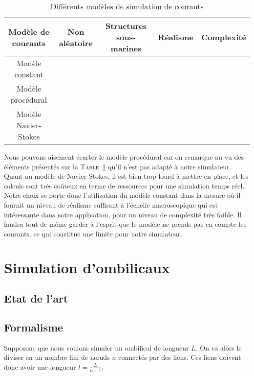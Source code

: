 			\begin{table}[ht]
				\centering
				\begin{adjustbox}{max width=\textwidth}
					\begin{tabular}{|c|c|c|c|c|}
						\hline
						\textbf{Modèle de courants} & \textbf{Non aléatoire} & \textbf{Structures sous-marines} & \textbf{Réalisme} & \textbf{Complexité} \\
						\hline
						Modèle constant & \cmark & \xmark & \pmark \pmark & \pmark\\
						\hline
						Modèle procédural & \xmark & \xmark & \pmark & \pmark \pmark \\
						\hline
						Modèle Navier-Stokes & \cmark & \cmark & \pmark \pmark \pmark & \pmark \pmark \pmark \\
						\hline
					\end{tabular}
				\end{adjustbox}
				\caption{Différents modèles de simulation de courants}
				\label{table:courants}
			\end{table}

			Nous pouvons aisement écarter le modèle procédural car on remarque au vu des éléments présentés sur la \textsc{Table}~\ref{table:courants} qu'il n'est pas adapté à notre simulateur. Quant au modèle de Navier-Stokes, il est bien trop lourd à mettre en place, et les calculs sont très coûteux en terme de ressources pour une simulation temps réel. Notre choix se porte donc l'utilisation du modèle constant dans la mesure où il fournit un niveau de réalisme suffisant à l'échelle macroscopique qui est intéressante dans notre application, pour un niveau de complexité très faible. Il faudra tout de même garder à l'esprit que le modèle ne prends pas en compte les courants, ce qui constitue une limite pour notre simulateur.

		\section{Simulation d'ombilicaux}

			\subsection{Etat de l'art}

			\subsection{Formalisme}

				Supposons que nous voulons simuler un ombilical de longueur $L$. On va alors le diviser en un nombre fini de n\oe uds $n$ connectés par des liens. Ces liens doivent donc avoir une longueur $l=\frac{L}{n-1}$.
			

